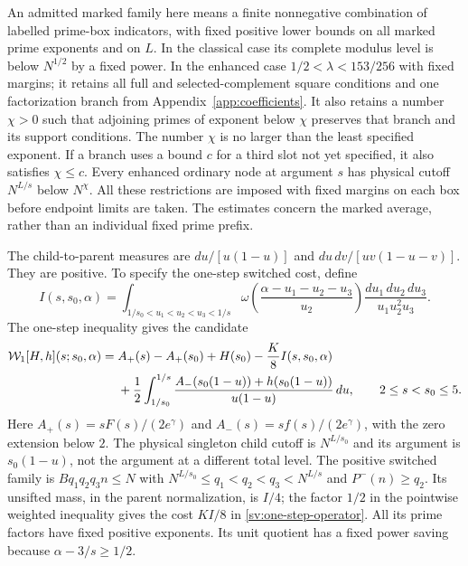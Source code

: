 An admitted marked family here means a finite nonnegative combination
of labelled prime-box indicators, with fixed positive lower bounds on
all marked prime exponents and on $L$. In the classical case its
complete modulus level is below $N^{1/2}$ by a fixed power. In the
enhanced case $1/2<\lambda<153/256$ with fixed margins; it retains all full and selected-complement square
conditions and one factorization branch from
Appendix~\ref{app:coefficients}. It also retains a number $\chi>0$
such that adjoining primes of exponent below $\chi$ preserves that
branch and its support conditions. The number $\chi$ is no larger than the least
specified exponent. If a branch uses a bound $c$ for a third slot
not yet specified, it also satisfies $\chi\le c$.
Every enhanced ordinary node at argument $s$ has physical cutoff
$N^{L/s}$ below $N^\chi$. All these restrictions are imposed with
fixed margins on each box before endpoint limits are taken. The
estimates concern the marked average, rather than an individual fixed
prime prefix.

The child-to-parent measures are
$du/[u(1-u)]$ and $du\,dv/[uv(1-u-v)]$.
They are positive.  To specify the one-step switched cost, define
\begin{equation}\label{sv:one-step-mass}
 I(s,s_0,\alpha)=
 \int_{1/s_0<u_1<u_2<u_3<1/s}
 \omega\!\left(\frac{\alpha-u_1-u_2-u_3}{u_2}\right)
                    \frac{du_1\,du_2\,du_3}{u_1u_2^2u_3}.
\end{equation}
The one-step inequality gives the candidate
\begin{align}\label{sv:one-step-operator}
 \mathcal W_1[H,h](s;s_0,\alpha)
 ={}&A_+(s)-A_+(s_0)+H(s_0)-\frac K8 I(s,s_0,\alpha)\notag\\
 &+\frac12\int_{1/s_0}^{1/s}
 \frac{A_-(s_0(1-u))+h(s_0(1-u))}{u(1-u)}\,du,
 \qquad 2\le s<s_0\le5.
\end{align}
Here $A_+(s)=sF(s)/(2e^\gamma)$ and
$A_-(s)=sf(s)/(2e^\gamma)$, with the zero extension below
$2$.  The physical singleton child cutoff is $N^{L/s_0}$ and its
argument is $s_0(1-u)$, not the argument at a different total level.
The positive switched family is
$Bq_1q_2q_3n\le N$ with
$N^{L/s_0}\le q_1<q_2<q_3<N^{L/s}$ and $P^-(n)\ge q_2$.
Its unsifted mass, in the parent normalization, is $I/4$; the
factor $1/2$ in the pointwise weighted inequality gives the cost
$KI/8$ in \eqref{sv:one-step-operator}.  All its prime factors
have fixed positive exponents.  Its unit quotient has a fixed power
saving because $\alpha-3/s\ge1/2$.

